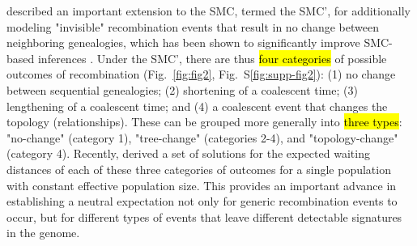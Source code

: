 \documentclass[11pt]{article}
\begin{document}
\cite{marjoram2006fast}
described an important extension to the SMC, termed the SMC', for additionally
modeling "invisible" recombination events that result in no change between 
neighboring genealogies, which has been shown to significantly improve SMC-based 
inferences \citep{wilton2015smc}. Under the SMC', there are thus \hl{four categories}
of possible outcomes of recombination 
(Fig.~\ref{fig:fig2}, Fig.~S\ref{fig:supp-fig2}): 
(1) no change between sequential genealogies;
(2) shortening of a coalescent time; (3) lengthening of a coalescent time; 
and (4) a coalescent event that changes the topology (relationships). 
These can be grouped more generally into \hl{three types}: 
"no-change" (category 1), "tree-change" (categories 2-4), and "topology-change"
(category 4). Recently, \citet{deng_distribution_2021} derived a set of solutions for
the expected waiting distances of each of these three categories of 
outcomes for a single population with constant effective population size.
This provides an important advance in establishing a neutral expectation not
only for generic recombination events to occur, but for different types 
of events that leave different detectable signatures in the genome.



\end{document}
